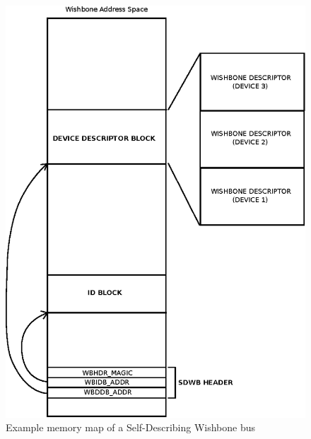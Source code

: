 \documentclass{article}
\begin{document}
\begin{figure}[!ht]
	\centering
	\includegraphics{wbmap.eps}
	\caption{Example memory map of a Self-Describing Wishbone bus}
	\label{fig:wbmap}
\end{figure}
\end{document}
